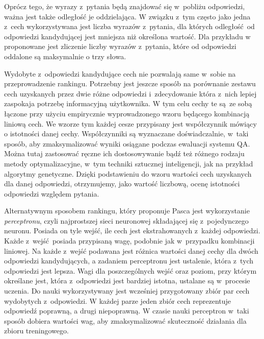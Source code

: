 \documentclass[a4paper, twoside, 12pt]{report}
\begin{document}
            Oprócz tego, że wyrazy z~pytania będą znajdować się w~pobliżu odpowiedzi, ważna jest także odległość je
            oddzielająca. W związku z~tym często jako jedna z~cech wykorzystywana jest liczba wyrazów z~pytania, dla
            których odległość od odpowiedzi kandydującej jest mniejsza niż określona wartość. Dla przykładu w~\cite{PASZKA}
            proponowane jest zliczenie liczby wyrazów z~pytania, które od odpowiedzi oddalone są maksymalnie o trzy słowa.

            Wydobyte z~odpowiedzi kandydujące cech nie pozwalają same w~sobie na przeprowadzenie rankingu. Potrzebny jest
            jeszcze sposób na porównanie zestawu cech uzyskanych przez dwie różne odpowiedzi i~zdecydowanie która z~nich
            lepiej zaspokaja potrzebę informacyjną użytkownika. W tym celu cechy te są ze sobą łączone przy użyciu empirycznie
            wyprowadzonego wzoru będącego kombinacją liniową cech. We wzorze tym każdej cesze przypisany jest
            współczynnik mówiący o istotności danej cechy.
            Współczynniki są wyznaczane doświadczalnie, w~taki sposób, aby zmaksymalizować wyniki osiągane podczas ewaluacji
            systemu QA. Można tutaj zastosować ręczne ich dostosowywanie bądź też różnego rodzaju metody optymalizacyjne,
            w~tym techniki sztucznej inteligencji, jak na przykład algorytmy genetyczne. Dzięki podstawieniu do wzoru
            wartości cech uzyskanych dla danej odpowiedzi, otrzymujemy, jako wartość liczbową, ocenę istotności odpowiedzi
            względem pytania.

            Alternatywnym sposobem rankingu, który proponuje Pasca jest wykorzystanie \emph{perceptronu}\cite{PASZKA},
            czyli najprostszej sieci neuronowej
            składającej się z~pojedynczego neuronu. Posiada on tyle wejść, ile cech jest ekstrahowanych z~każdej odpowiedzi.
            Każde z~wejść posiada przypisaną wagę, podobnie jak w~przypadku kombinacji liniowej. Na każde z~wejść
            podawana jest różnica wartości danej cechy dla dwóch odpowiedzi kandydujących, a zadaniem perceptronu jest
            ustalenie, która z~tych odpowiedzi jest lepsza. Wagi dla poszczególnych wejść oraz poziom, przy którym
            określane jest, która z~odpowiedzi jest bardziej istotna, ustalane są w~procesie uczenia. Do nauki wykorzystywany
            jest wcześniej przygotowany zbiór par cech wydobytych z~odpowiedzi. W każdej parze jeden zbiór cech reprezentuje
            odpowiedź poprawną, a drugi niepoprawną.  W czasie nauki perceptron w~taki sposób dobiera wartości wag,
            aby zmaksymalizować skuteczność działania dla zbioru treningowego.\cite{PERCEPTRONRANKING}
\end{document}
